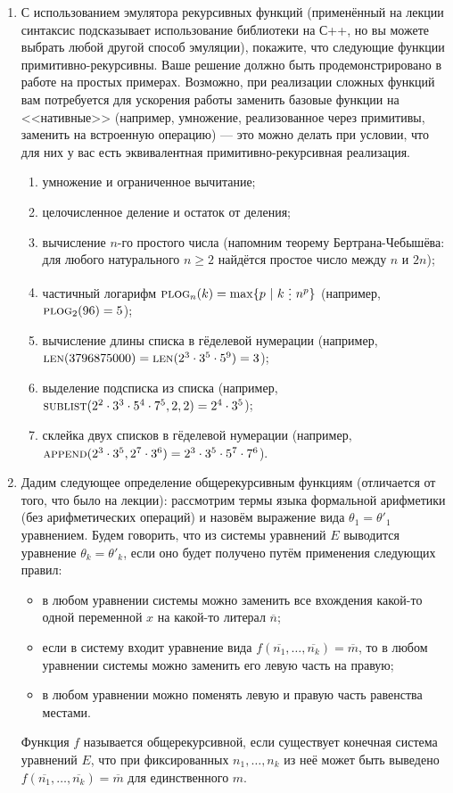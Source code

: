 \documentclass[10pt,a4paper,oneside]{article}
\begin{document}
\begin{enumerate}
\item С использованием эмулятора рекурсивных функций (применённый на лекции синтаксис
подсказывает использование библиотеки на С++, но вы можете выбрать любой другой способ эмуляции),
покажите, что следующие функции примитивно-рекурсивны. Ваше решение должно быть продемонстрировано
в работе на простых примерах. Возможно, при реализации сложных функций вам потребуется 
для ускорения работы заменить базовые функции на <<нативные>> (например, умножение, реализованное
через примитивы, заменить на встроенную операцию) --- это можно делать при условии, что для них у вас есть 
эквивалентная примитивно-рекурсивная реализация.
\begin{enumerate}
\item умножение и ограниченное вычитание;
\item целочисленное деление и остаток от деления;
\item вычисление $n$-го простого числа (напомним теорему Бертрана-Чебышёва: для любого натурального $n \ge 2$ найдётся
простое число между $n$ и $2n$);
\item частичный логарифм $\textsc{plog}_n(k) = \max\{p\ |\ k\ \raisebox{-0.5ex}{\vdots}\ n^p\}$ (например, $\textsc{plog}_2(96)=5$);
\item вычисление длины списка в гёделевой нумерации (например, $\textsc{len}(3796875000) = \textsc{len}(2^3\cdot 3^5\cdot 5^9) = 3$);
\item выделение подсписка из списка (например, $\textsc{sublist}(2^2 \cdot 3^3 \cdot 5^4 \cdot 7^5, 2, 2) = 2^4 \cdot 3^5$);
\item склейка двух списков в гёделевой нумерации (например, $\textsc{append}(2^3 \cdot 3^5,2^7 \cdot 3^6) = 2^3 \cdot 3^5 \cdot 5^7 \cdot 7^6$).
\end{enumerate}

\item Дадим следующее определение общерекурсивным функциям (отличается от того, что было на лекции): 
рассмотрим термы языка формальной арифметики (без арифметических операций) и назовём 
выражение вида $\theta_1=\theta'_1$ уравнением. Будем говорить, что из системы уравнений $E$ выводится уравнение
$\theta_k=\theta'_k$, если оно будет получено путём применения следующих правил:
\begin{itemize}
\item в любом уравнении системы можно заменить все вхождения какой-то одной переменной $x$ на какой-то литерал $\overline{n}$;
\item если в систему входит уравнение вида $f(\overline{n_1},\dots,\overline{n_k})=\overline{m}$, то 
в любом уравнении системы можно заменить его левую часть на правую;
\item в любом уравнении можно поменять левую и правую часть равенства местами.
\end{itemize}
Функция $f$ называется общерекурсивной, если существует конечная система уравнений $E$, что при фиксированных $n_1,\dots,n_k$
из неё может быть выведено $f(\overline{n_1},\dots,\overline{n_k}) = \overline{m}$
для единственного $m$.


\end{enumerate}
\end{document}
